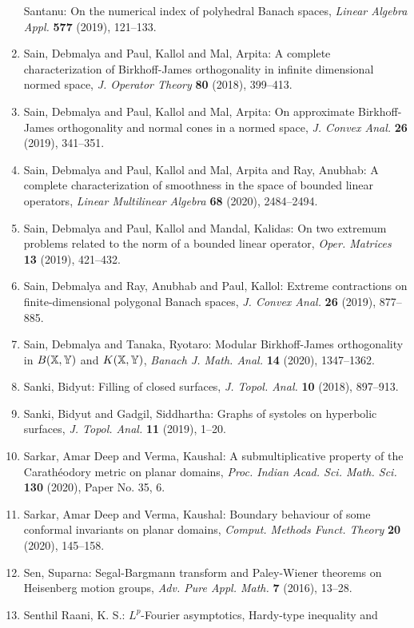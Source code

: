 \begin{enumerate}
Santanu: On the numerical index of polyhedral {B}anach spaces, \emph{Linear Algebra Appl.} {\bf 577} (2019), 121--133.
\item Sain, Debmalya and Paul, Kallol and Mal, Arpita: A complete characterization of {B}irkhoff-{J}ames
orthogonality in infinite dimensional normed space, \emph{J. Operator Theory} {\bf 80} (2018), 399--413.
\item Sain, Debmalya and Paul, Kallol and Mal, Arpita: On approximate {B}irkhoff-{J}ames orthogonality and normal
cones in a normed space, \emph{J. Convex Anal.} {\bf 26} (2019), 341--351.
\item Sain, Debmalya and Paul, Kallol and Mal, Arpita and Ray,
Anubhab: A complete characterization of smoothness in the space of
bounded linear operators, \emph{Linear Multilinear Algebra} {\bf 68} (2020), 2484--2494.
\item Sain, Debmalya and Paul, Kallol and Mandal, Kalidas: On two extremum problems related to the norm of a bounded
linear operator, \emph{Oper. Matrices} {\bf 13} (2019), 421--432.
\item Sain, Debmalya and Ray, Anubhab and Paul, Kallol: Extreme contractions on finite-dimensional polygonal {B}anach
spaces, \emph{J. Convex Anal.} {\bf 26} (2019), 877--885.
\item Sain, Debmalya and Tanaka, Ryotaro: Modular {B}irkhoff-{J}ames orthogonality in {$B(\Bbb{X,Y})$}
and {$K(\Bbb{X,Y})$}, \emph{Banach J. Math. Anal.} {\bf 14} (2020), 1347--1362.
\item Sanki, Bidyut: Filling of closed surfaces, \emph{J. Topol. Anal.} {\bf 10} (2018), 897--913.
\item Sanki, Bidyut and Gadgil, Siddhartha: Graphs of systoles on hyperbolic surfaces, \emph{J. Topol. Anal.} {\bf 11} (2019), 1--20.
\item Sarkar, Amar Deep and Verma, Kaushal: A submultiplicative property of the {C}arath\'{e}odory metric on
planar domains, \emph{Proc. Indian Acad. Sci. Math. Sci.} {\bf 130} (2020), Paper No. 35, 6.
\item Sarkar, Amar Deep and Verma, Kaushal: Boundary behaviour of some conformal invariants on planar
domains, \emph{Comput. Methods Funct. Theory} {\bf 20} (2020), 145--158.
\item Sen, Suparna: Segal-{B}argmann transform and {P}aley-{W}iener theorems on
{H}eisenberg motion groups, \emph{Adv. Pure Appl. Math.} {\bf 7} (2016), 13--28.
\item Senthil Raani, K. S.: {$L^p$}-{F}ourier asymptotics, {H}ardy-type inequality and

\end{enumerate}
